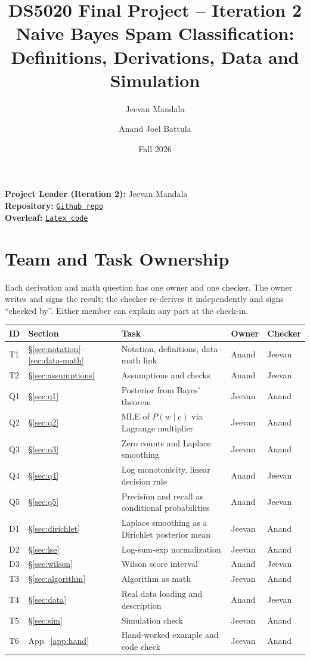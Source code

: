 \documentclass[11pt]{article}
\title{DS5020 Final Project -- Iteration 2\\[2pt]
\large Naive Bayes Spam Classification: Definitions, Derivations, Data and Simulation}
\author{Jeevan Mandala \and Anand Joel Battula}
\date{Fall 2026}
\theoremstyle{plain}
\theoremstyle{definition}
\begin{document}
\maketitle

\noindent\textbf{Project Leader (Iteration 2):} Jeevan Mandala\\
\textbf{Repository:} 
\href{https://github.com/Jeev2727/Ds5020-naive-bayes-classifier}{\texttt{Github repo}} \\
\textbf{Overleaf:} \href{https://www.overleaf.com/project/6af8e7c4a2e68e546f457ae0/share#96183df2ea7e80e3119e925675021469490224631bf61309}{\texttt{Latex code}} 

\tableofcontents

\section{Team and Task Ownership}
Each derivation and math question has one owner and one checker. The owner writes and signs
the result; the checker re-derives it independently and signs ``checked by''. Either member can
explain any part at the check-in.

\begin{center}
\begin{tabularx}{\textwidth}{@{}llXll@{}}
\toprule
ID & Section & Task & Owner & Checker\\
\midrule
T1 & \S\ref{sec:notation}--\ref{sec:data-math} & Notation, definitions, data--math link & Anand & Jeevan\\
T2 & \S\ref{sec:assumptions} & Assumptions and checks & Anand & Jeevan\\
Q1 & \S\ref{sec:q1} & Posterior from Bayes' theorem & Jeevan & Anand\\
Q2 & \S\ref{sec:q2} & MLE of $P(w\mid c)$ via Lagrange multiplier & Jeevan & Anand\\
Q3 & \S\ref{sec:q3} & Zero counts and Laplace smoothing & Jeevan & Anand\\
Q4 & \S\ref{sec:q4} & Log monotonicity, linear decision rule & Anand & Jeevan\\
Q5 & \S\ref{sec:q5} & Precision and recall as conditional probabilities & Anand & Jeevan\\
D1 & \S\ref{sec:dirichlet} & Laplace smoothing as a Dirichlet posterior mean & Jeevan & Anand\\
D2 & \S\ref{sec:lse} & Log-sum-exp normalization & Jeevan & Anand\\
D3 & \S\ref{sec:wilson} & Wilson score interval & Anand & Jeevan\\
T3 & \S\ref{sec:algorithm} & Algorithm as math & Jeevan & Anand\\
T4 & \S\ref{sec:data} & Real data loading and description & Anand & Jeevan\\
T5 & \S\ref{sec:sim} & Simulation check & Jeevan & Anand\\
T6 & App.~\ref{app:hand} & Hand-worked example and code check & Jeevan & Anand\\
\bottomrule
\end{tabularx}
\end{center}
\end{document}
